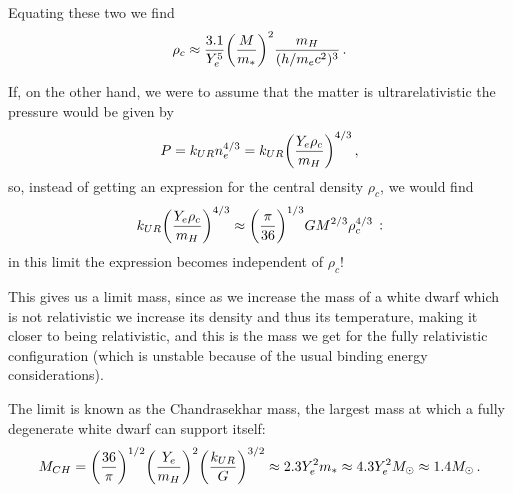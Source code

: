 \documentclass[main.tex]{subfiles}
\begin{document}
Equating these two we find
%
\begin{align}
  \rho_{c} \approx \frac{\num{3.1}}{Y_e^{5}} \qty(\frac{M}{m_{*}})^2 \frac{m_H}{(h / m_e c^2)^{3}}
\,.
\end{align}


If, on the other hand, we were to assume that the matter is ultrarelativistic the pressure would be given by
%
\begin{align}
P = k_{UR} n_e^{4/3} 
= k_{UR}\qty(\frac{Y_e \rho_{c}}{m_H})^{4/3}
\,,
\end{align}
%
so, instead of getting an expression for the central density \(\rho _c\), we would find
%
\begin{align}
  k_{UR} \qty(\frac{Y_e \rho_{c}}{m_H})^{4/3} \approx 
  \qty(\frac{\pi }{36})^{1/3} G M^{2/3} \rho_{c}^{4/3}
\,:
\end{align}
%
in this limit the expression becomes independent of \(\rho_{c}\)!

This gives us a limit mass, since as we increase the mass of a white dwarf which is not relativistic we increase its density and thus its temperature, making it closer to being relativistic, and this is the mass we get for the fully relativistic configuration (which is unstable because of the usual binding energy considerations).

The limit is known as the Chandrasekhar mass, the largest mass at which a fully degenerate white dwarf can support itself:
%
\begin{align}
  M_{CH} = 
  \qty(\frac{36}{\pi } )^{1/2} \qty(\frac{Y_e}{m_H})^2
  \qty(\frac{k_{UR}}{G})^{3/2} \approx 2.3 Y_e^2 m_{*} \approx 4.3 Y_e^2 M_{\odot} \approx 1.4 M_{\odot}
\,.
\end{align}



\end{document}
